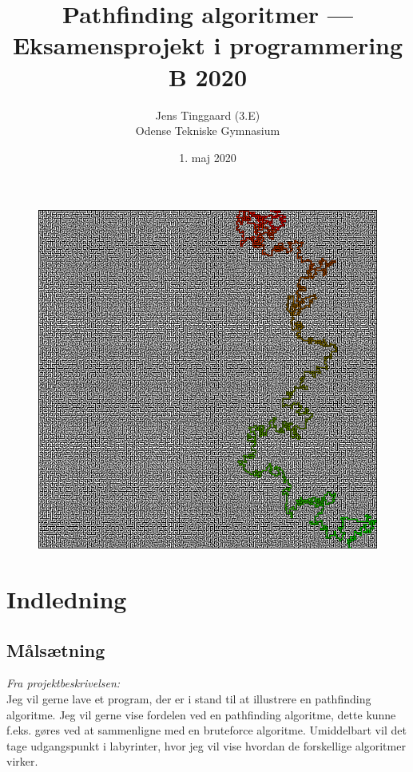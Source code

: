 \documentclass[a4paper, 12pt]{article}
\title{Pathfinding algoritmer --- Eksamensprojekt i programmering B 2020}
\author{Jens Tinggaard (3.E)\\Odense Tekniske Gymnasium}
\date{1. maj 2020}
\begin{document}
\begin{titlepage}
  \maketitle

  \begin{figure}[h]
    \includegraphics[width=\textwidth]{img/fp.png}
    \centering
  \end{figure}

  \thispagestyle{empty} %
\end{titlepage}


\newpage
\tableofcontents


\newpage
\section{Indledning}
\subsection{Målsætning}
\textit{Fra projektbeskrivelsen:}\\
Jeg vil gerne lave et program, der er i stand til at illustrere en pathfinding algoritme. Jeg vil gerne vise fordelen ved en pathfinding algoritme, dette kunne f.eks. gøres ved at sammenligne med en bruteforce algoritme. Umiddelbart vil det tage udgangspunkt i labyrinter, hvor jeg vil vise hvordan de forskellige algoritmer virker.
\end{document}
